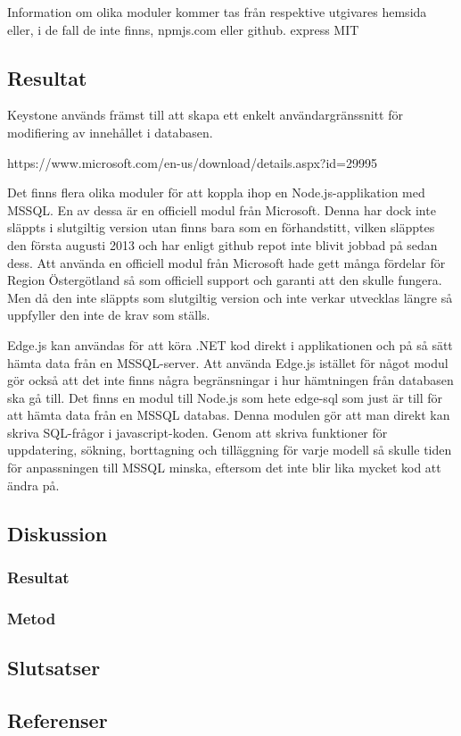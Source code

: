 Information om olika moduler kommer tas från respektive utgivares hemsida eller, i de fall de inte finns, npmjs.com eller github.
express MIT

\subsection{Resultat}
Keystone används främst till att skapa ett enkelt användargränssnitt för modifiering av innehållet i databasen. 

https://www.microsoft.com/en-us/download/details.aspx?id=29995

Det finns flera olika moduler för att koppla ihop en Node.js-applikation med MSSQL. En av dessa är en officiell modul från Microsoft. Denna har dock inte släppts i slutgiltig version utan finns bara som en förhandstitt, vilken släpptes den första augusti 2013 och har enligt github repot inte blivit jobbad på sedan dess. Att använda en officiell modul från Microsoft hade gett många fördelar för Region Östergötland så som officiell support och garanti att den skulle fungera. Men då den inte släppts som slutgiltig version och inte verkar utvecklas längre så uppfyller den inte de krav som ställs.

Edge.js kan användas för att köra .NET kod direkt i applikationen och på så sätt hämta data från en MSSQL-server. Att använda Edge.js istället för något modul gör också att det inte finns några begränsningar i hur hämtningen från databasen ska gå till. Det finns en modul till Node.js som hete edge-sql som just är till för att hämta data från en MSSQL databas. Denna modulen gör att man direkt kan skriva SQL-frågor i javascript-koden. Genom att skriva funktioner för uppdatering, sökning, borttagning och tilläggning för varje modell så skulle tiden för anpassningen till MSSQL minska, eftersom det inte blir lika mycket kod att ändra på. 
\subsection{Diskussion}
\subsubsection{Resultat}
\subsubsection{Metod}
\subsection{Slutsatser}
\subsection{Referenser}
\vspace{-9mm}
\begin{thebibliography}{9}

\end{thebibliography}
